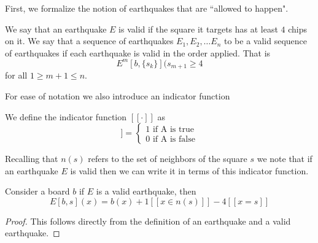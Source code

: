 \documentclass[runningheads,a4paper]{llncs}
\begin{document}
First, we formalize the notion of earthquakes that are ``allowed to happen".

\begin{definition}
We say that an earthquake $E$ is valid if the square it targets has at least $4$ chips on it. 
We say that a sequence of earthquakes $E_1, E_2, \ldots E_n$ to be a valid sequence of earthquakes if each earthquake is valid in the order applied. That is 
\begin{equation*}
E^{m}[b, \{s_k\}](s_{m+1}  \geq 4
\end{equation*}
for all $1\geq m+1 \leq n$.
\end{definition}


For ease of notation we also introduce an indicator function
\begin{definition}
We define the indicator function $[[\cdot]]$ as 
\begin{equation*}
[[A]] = \begin{cases} 1 \text{ if A is true} \\ 0 \text{ if A is false} \end{cases}
\end{equation*}
\end{definition}

Recalling that $n(s)$ refers to the set of neighbors of the square $s$ we note that if an earthquake $E$ is valid then we can write it in terms of this indicator function.
\begin{lemma} 
\label{earthquakeredefine}
Consider a board $b$ if $E$ is a valid earthquake, then 
\begin{equation*}
E[b, s](x) = b(x) + 1[[ x \in n(s)]] - 4[[x =s]]
\end{equation*}
\end{lemma}
\begin{proof}
This follows directly from the definition of an earthquake and a valid earthquake. 
\end{proof}
\end{document}
